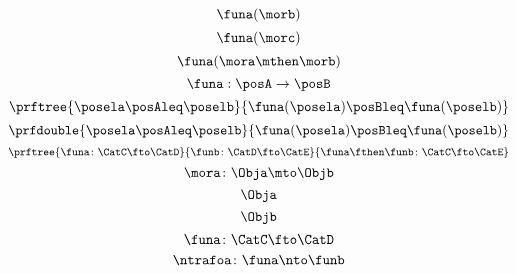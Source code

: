 {\begin{forslides}
\begin{equation}
        \end{equation}
        \begin{equation}
            \label{eq:slides_Fg}
            \funa(\morb)
        \end{equation}
        \begin{equation}
            \label{eq:slides_Fh}
            \funa(\morc)
        \end{equation}
        \begin{equation}
            \label{eq:slides_Ffg}
            \funa(\mora\mthen\morb)
        \end{equation}
        \begin{equation}
            \label{eq:mono1}
            \funa: \posA \to \posB
        \end{equation}
        \begin{equation}
            \label{eq:mono2}
            \prftree{\posela \posAleq \poselb}{\funa(\posela) \posBleq \funa(\poselb)}
        \end{equation}
        \begin{equation}
            \label{eq:mono3}
            \prfdouble{\posela \posAleq \poselb}{\funa(\posela) \posBleq \funa(\poselb)}
        \end{equation}
        \begin{equation}
            \label{eq:functor-composition1}
            \prftree{\funa\colon \CatC \fto \CatD}{\funb\colon\CatD\fto\CatE}{\funa\fthen\funb\colon \CatC \fto \CatE}
        \end{equation}
        \begin{equation}
            \label{eq:slides_mora}
            \mora\colon \Obja\mto\Objb
        \end{equation}
        \begin{equation}
            \label{eq:slides_mora_obja}
            \Obja
        \end{equation}
        \begin{equation}
            \label{eq:slides_mora_objb}
            \Objb
        \end{equation}
        \begin{equation}
            \label{eq:slides_funa}
            \funa\colon\CatC\fto\CatD
        \end{equation}
        \begin{equation}
            \label{eq:slides_ntrafoa}
            \ntrafoa\colon\funa\nto\funb
        \end{equation}
        \begin{equation}

\end{equation}
\end{forslides}}
